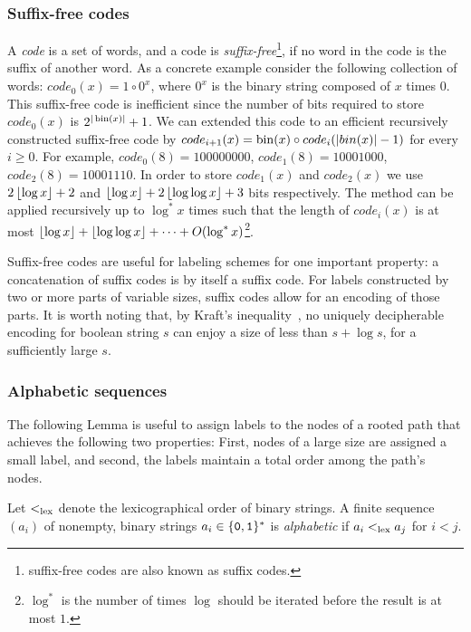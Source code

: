 \subsubsection{Suffix-free codes}\label{tec:suffix}
A \emph{code} is a set of words, and a code is \emph{suffix-free}\footnote{ suffix-free codes are also known as suffix codes.}, if no word in the code is the suffix of another word.
As a concrete example consider the following collection of words:
$code_0(x) = 1 \circ 0^x$, where $0^x$ is the binary string composed of $x$ times $0$.
This suffix-free code is inefficient since the number of bits required to store $code_0(x)$ is $2^{\vert \operatorname{bin}(x) \vert}+1$.
We can  extended this code  to an efficient  recursively constructed suffix-free code by
$code_{i+1}(x) = \operatorname{bin}(x) \circ code_i(\vert bin (x) \vert - 1)$ for every $i \geq 0$. 
For example,  $code_0(8) = 100000000$, $code_1(8) = 1000 1000$, $code_2(8) = 1000 11 10$.  
In order to store  $code_1(x)$ and $code_2(x)$ we use $2 \left\lfloor{\log{x}}\right\rfloor +2$ and $\left\lfloor{\log x}\right\rfloor+ 2\left\lfloor{\log \log x}\right\rfloor+ 3$ bits respectively.
The method can be applied recursively  up to $\log^* x $ times such that the length of 
 $code_i(x)$  is at most $   \left\lfloor{\log x}\right\rfloor  + \left\lfloor{ \log  \log x}\right\rfloor + \dots +  O(\log^* x)$\footnote{$\log^*$ is the number of times $\log$ should be iterated before the result is at most $1$.}.
 
Suffix-free codes are useful for labeling schemes for one important property: a concatenation of suffix codes is by itself a suffix code. For labels constructed by two or more parts of variable sizes, suffix codes allow for an encoding of those parts.
It is worth noting that, by Kraft's inequality~\cite{cover2012elements}, no  uniquely decipherable encoding  for boolean string $s$ can enjoy a size of less than $s + \log  s$, for a  sufficiently large $s$.

\subsubsection{Alphabetic sequences}\label{tec:alphabetic}
The following Lemma is useful to assign labels to the nodes of a rooted path that achieves the following two properties:
First, nodes of  a large size are assigned a small label, and  second, the labels maintain a total order among the path's nodes.

Let $\lex$ denote the lexicographical order of binary strings. A finite sequence $(a_i)$ of nonempty, binary strings $a_i\in\{\mathtt{0},\mathtt{1}\}^*$ is \emph{alphabetic} if $a_i \lex a_j$ for $i<j$. 


